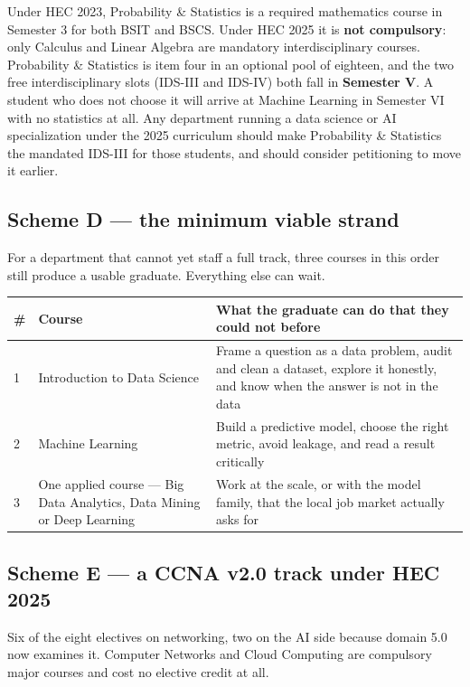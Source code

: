 \documentclass[11pt,a4paper,oneside]{report}
\begin{document}
\begin{warnbox}
Under HEC 2023, Probability \& Statistics is a required mathematics course in
Semester 3 for both BSIT and BSCS. Under HEC 2025 it is \textbf{not compulsory}:
only Calculus and Linear Algebra are mandatory interdisciplinary courses.
Probability \& Statistics is item four in an optional pool of eighteen, and the
two free interdisciplinary slots (IDS-III and IDS-IV) both fall in
\textbf{Semester V}. A student who does not choose it will arrive at Machine
Learning in Semester VI with no statistics at all. Any department running a data
science or AI specialization under the 2025 curriculum should make Probability \&
Statistics the mandated IDS-III for those students, and should consider petitioning
to move it earlier.
\end{warnbox}

\subsection{Scheme D --- the minimum viable strand}

For a department that cannot yet staff a full track, three courses in this order
still produce a usable graduate. Everything else can wait.

\begin{longtable}{@{}L{1.2cm}L{4.9cm}L{9.6cm}@{}}
\toprule
{}
\textbf{\#} & \textbf{Course} & \textbf{What the graduate can do that they could not before} \\
\midrule
{} & Introduction to Data Science &
Frame a question as a data problem, audit and clean a dataset, explore it
honestly, and know when the answer is not in the data \\
2 & Machine Learning &
Build a predictive model, choose the right metric, avoid leakage, and read a
result critically \\
3 & One applied course --- Big Data Analytics, Data Mining or Deep Learning &
Work at the scale, or with the model family, that the local job market actually
asks for \\
\bottomrule
\end{longtable}

\subsection{Scheme E --- a CCNA v2.0 track under HEC 2025}

Six of the eight electives on networking, two on the AI side because domain 5.0
now examines it. Computer Networks and Cloud Computing are compulsory major
courses and cost no elective credit at all.
\end{document}
